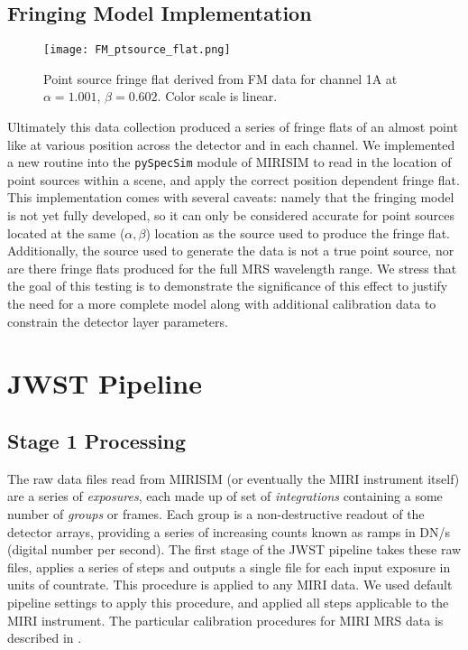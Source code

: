 \subsection{Fringing Model Implementation}
\begin{wrapfigure}{r}{5.5cm}
	\texttt{[image: FM\_ptsource\_flat.png]}
	\caption{Point source fringe flat derived from FM data for channel 1A at $\alpha=1.001$, $\beta=0.602$. Color scale is linear.}
	\label{fig:ptsrcfringeflat}
\end{wrapfigure}
Ultimately this data collection produced a series of fringe flats of an almost point like at various position across the detector and in each channel.
We implemented a new routine into the \verb|pySpecSim| module of MIRISIM to read in the location of point sources within a scene, and apply the correct position dependent fringe flat. 
This implementation comes with several caveats: namely that the fringing model is not yet fully developed, so it can only be considered accurate for point sources located at the same ($\alpha,\beta$) location as the source used to produce the fringe flat. Additionally, the source used to generate the data is not a true point source, nor are there fringe flats produced for the full MRS wavelength range.
We stress that the goal of this testing is to demonstrate the significance of this effect to justify the need for a more complete model along with additional calibration data to constrain the detector layer parameters.

\section{JWST Pipeline}
\parencite{Bushouse2015} %
\subsection{Stage 1 Processing}
The raw data files read from MIRISIM (or eventually the MIRI instrument itself) are a series of \textit{exposures}, each made up of set of \textit{integrations} containing a some number of \textit{groups} or frames.
Each group is a non-destructive readout of the detector arrays, providing a series of increasing counts known as ramps in DN/s (digital number per second). 
The first stage of the JWST pipeline takes these raw files, applies a series of steps and outputs a single file for each input exposure in units of countrate.
This procedure is applied to any MIRI data.
We used default pipeline settings to apply this procedure, and applied all steps applicable to the MIRI instrument.
The particular calibration procedures for MIRI MRS data is described in \parencite{ref:mirical}.
